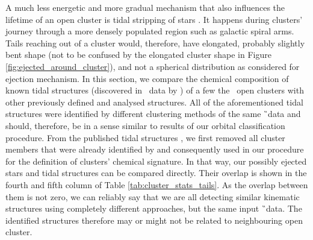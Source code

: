 A much less energetic and more gradual mechanism that also influences the lifetime of an open cluster is tidal stripping of stars \cite{2006A&A...455L..17L}. It happens during clusters' journey through a more densely populated region such as galactic spiral arms. Tails reaching out of a cluster would, therefore, have elongated, probably slightly bent shape (not to be confused by the elongated cluster shape in Figure \ref{fig:ejected_around_cluster}), and not a spherical distribution as considered for ejection mechanism. In this section, we compare the chemical composition of known tidal structures (discovered in \Gs\ data by \citet{2019AA...627A...4R, 2019AA...627A.119C, 2019AA...621L...3M, 2019arXiv191206657Z}) of a few the \Gh\ open clusters with other previously defined and analysed structures. All of the aforementioned tidal structures were identified by different clustering methods of the same \G\ data and should, therefore, be in a sense similar to results of our orbital classification procedure. From the published tidal structures \cite{2019AA...627A...4R, 2019AA...627A.119C, 2019AA...621L...3M, 2019arXiv191206657Z}, we first removed all cluster members that were already identified by \citet{2018A&A...618A..93C} and consequently used in our procedure for the definition of clusters' chemical signature. In that way, our possibly ejected stars and tidal structures can be compared directly. Their overlap is shown in the fourth and fifth column of Table \ref{tab:cluster_stats_tails}. As the overlap between them is not zero, we can reliably say that we are all detecting similar kinematic structures using completely different approaches, but the same input \G\ data. The identified structures therefore may or might not be related to neighbouring open cluster.

